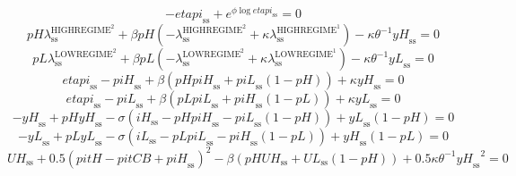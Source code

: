 \begin{equation}
-{e\!t\!a\!p\!i}_\mathrm{ss} + e^{{\phi} {\log{{e\!t\!a\!p\!i}_\mathrm{ss}}}} = 0
\end{equation}
\begin{equation}
{{p\!H}} {\lambda^{\mathrm{HIGHREGIME}^{\mathrm{2}}}_\mathrm{ss}} + {\beta} {{p\!H}} \left(-\lambda^{\mathrm{HIGHREGIME}^{\mathrm{2}}}_\mathrm{ss} + {\kappa} {\lambda^{\mathrm{HIGHREGIME}^{\mathrm{1}}}_\mathrm{ss}}\right) - {\kappa} {\theta}^{-1} {{y\!H}_\mathrm{ss}} = 0
\end{equation}
\begin{equation}
{{p\!L}} {\lambda^{\mathrm{LOWREGIME}^{\mathrm{2}}}_\mathrm{ss}} + {\beta} {{p\!L}} \left(-\lambda^{\mathrm{LOWREGIME}^{\mathrm{2}}}_\mathrm{ss} + {\kappa} {\lambda^{\mathrm{LOWREGIME}^{\mathrm{1}}}_\mathrm{ss}}\right) - {\kappa} {\theta}^{-1} {{y\!L}_\mathrm{ss}} = 0
\end{equation}
\begin{equation}
{e\!t\!a\!p\!i}_\mathrm{ss} - {p\!i\!H}_\mathrm{ss} + {\beta} \left({{p\!H}} {{p\!i\!H}_\mathrm{ss}} + {{p\!i\!L}_\mathrm{ss}} \left(1 - {p\!H}\right)\right) + {\kappa} {{y\!H}_\mathrm{ss}} = 0
\end{equation}
\begin{equation}
{e\!t\!a\!p\!i}_\mathrm{ss} - {p\!i\!L}_\mathrm{ss} + {\beta} \left({{p\!L}} {{p\!i\!L}_\mathrm{ss}} + {{p\!i\!H}_\mathrm{ss}} \left(1 - {p\!L}\right)\right) + {\kappa} {{y\!L}_\mathrm{ss}} = 0
\end{equation}
\begin{equation}
-{y\!H}_\mathrm{ss} + {{p\!H}} {{y\!H}_\mathrm{ss}} - {\sigma} \left({i\!H}_\mathrm{ss} - {{p\!H}} {{p\!i\!H}_\mathrm{ss}} - {{p\!i\!L}_\mathrm{ss}} \left(1 - {p\!H}\right)\right) + {{y\!L}_\mathrm{ss}} \left(1 - {p\!H}\right) = 0
\end{equation}
\begin{equation}
-{y\!L}_\mathrm{ss} + {{p\!L}} {{y\!L}_\mathrm{ss}} - {\sigma} \left({i\!L}_\mathrm{ss} - {{p\!L}} {{p\!i\!L}_\mathrm{ss}} - {{p\!i\!H}_\mathrm{ss}} \left(1 - {p\!L}\right)\right) + {{y\!H}_\mathrm{ss}} \left(1 - {p\!L}\right) = 0
\end{equation}
\begin{equation}
{U\!H}_\mathrm{ss} + 0.5\left({p\!i\!t\!H} - {p\!i\!t\!C\!B} + {p\!i\!H}_\mathrm{ss}\right)^{2} - {\beta} \left({{p\!H}} {{U\!H}_\mathrm{ss}} + {{U\!L}_\mathrm{ss}} \left(1 - {p\!H}\right)\right) + 0.5{\kappa} {\theta}^{-1} {{y\!H}_\mathrm{ss}}^{2} = 0
\end{equation}
